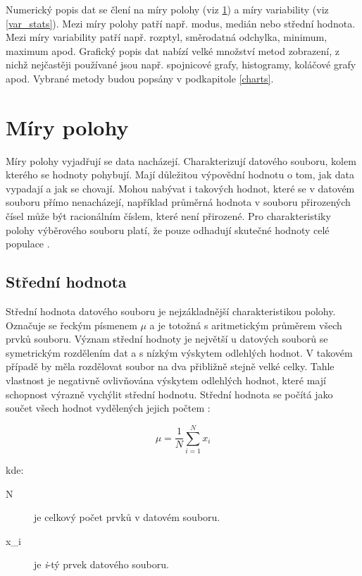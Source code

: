 Numerický popis dat se člení na míry polohy (viz \ref{avg_stats}) a míry variability (viz \ref{var_stats}). Mezi míry polohy patří např. modus, medián nebo střední hodnota. Mezi míry variability patří např. rozptyl, směrodatná odchylka, minimum, maximum apod. Grafický popis dat nabízí velké množství metod zobrazení, z nichž nejčastěji používané jsou např. spojnicové grafy, histogramy, koláčové grafy apod. Vybrané metody budou popsány v podkapitole \ref{charts}.  


\section{Míry polohy}
\label{avg_stats}

Míry polohy vyjadřují  se data nacházejí. Charakterizují  datového souboru, kolem kterého se hodnoty pohybují. Mají důležitou výpovědní hodnotu o tom, jak data vypadají a jak se chovají. Mohou nabývat i takových hodnot, které se v datovém souboru přímo nenacházejí, například průměrná hodnota v souboru přirozených čísel může být racionálním číslem, které není přirozené. Pro charakteristiky polohy výběrového souboru platí, že pouze odhadují skutečné hodnoty celé populace \cite{average}.


\subsection*{Střední hodnota}

Střední hodnota datového souboru je nejzákladnější charakteristikou polohy. Označuje se řeckým písmenem $\mu$ a je totožná s aritmetickým průměrem všech prvků souboru. Význam střední hodnoty je největší u datových souborů se symetrickým rozdělením dat a s nízkým výskytem odlehlých hodnot. V takovém případě by měla rozdělovat soubor na dva přibližně stejně velké celky. Tahle vlastnost je negativně ovlivňována výskytem odlehlých hodnot, které mají schopnost výrazně vychýlit střední hodnotu. Střední hodnota se počítá jako součet všech hodnot vydělených jejich počtem \cite{skiena}:


\begin{equation}
\mu = \frac{1}{N} \sum_{i=1}^{N} x_{i}
\end{equation}

\noindent kde:



\begin{description}
    \item[N] je celkový počet prvků v datovém souboru.
    \item[x_i] je \emph{i}-tý prvek datového souboru.
\end{description}


